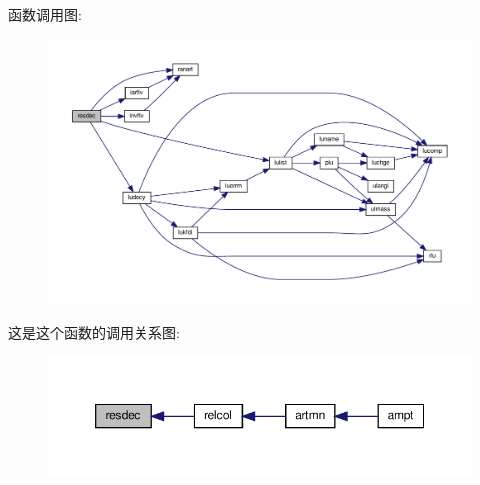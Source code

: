 函数调用图\+:
\nopagebreak
\begin{figure}[H]
\begin{center}
\leavevmode
\includegraphics[width=350pt]{resdec_8f90_a04fe6ad47820be669e3d14f5c1b78693_cgraph}
\end{center}
\end{figure}
这是这个函数的调用关系图\+:
\nopagebreak
\begin{figure}[H]
\begin{center}
\leavevmode
\includegraphics[width=350pt]{resdec_8f90_a04fe6ad47820be669e3d14f5c1b78693_icgraph}
\end{center}
\end{figure}
